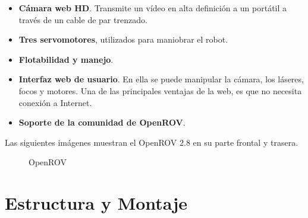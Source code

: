   \begin{itemize}
  \item \textbf{Cámara web HD}. Transmite un vídeo en alta definición a un portátil a través de un cable de par trenzado.
  \item \textbf{Tres servomotores}, utilizados para maniobrar el robot.
  \item \textbf{Flotabilidad y manejo}.
  \item \textbf{Interfaz web de usuario}. En ella se puede manipular la cámara, los láseres, focos y motores. Una de las principales ventajas de la web, es que no necesita conexión a Internet.
  \item \textbf{Soporte de la comunidad de OpenROV}.
  \end{itemize}
Las siguientes imágenes muestran el OpenROV 2.8 en su parte frontal y trasera.
\begin{figure}[hbtp]
  \begin{center}
  \end{center}
  \caption{OpenROV}
  \label{fig:ROV-ej}
\end{figure}
\newpage
\section{Estructura y Montaje}
\label{cap:montaje}

